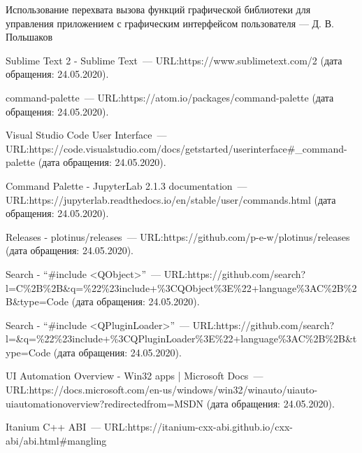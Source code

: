 \renewcommand{\bibname}{Список использованных источников}
\begin{thebibliography}{99}

 Использование перехвата вызова функций графической библиотеки для управления приложением с графическим интерфейсом пользователя --- Д. В. Польшаков

 Sublime Text 2 \-- Sublime Text~---
URL:\@ https://www.sublimetext.com/2
(дата обращения: 24.05.2020).

 command-palette~---
URL:\@ https://atom.io/packages/command-palette
(дата обращения: 24.05.2020).

 Visual Studio Code User Interface~---
URL:\@ https://code.visualstudio.com/docs/getstarted/userinterface\#\_command-palette
(дата обращения: 24.05.2020).

 Command Palette \-- JupyterLab 2.1.3 documentation~---
URL:\@ https://jupyterlab.readthedocs.io/en/stable/user/commands.html
(дата обращения: 24.05.2020).

 Releases \-- plotinus/releases~---
URL:\@  https://github.com/p-e-w/plotinus/releases
(дата обращения: 24.05.2020).

 Search \-- ``\#include <QObject>''~---
URL:\@ https://github.com/search?l=C\%2B\%2B\&q=\%22\%23include+\%3CQObject\%3E\%22+language\%3AC\%2B\%2B\&type=Code
(дата обращения: 24.05.2020).

 Search \-- ``\#include <QPluginLoader>''~---
URL:\@ https://github.com/search?l=\&q=\%22\%23include+\%3CQPluginLoader\%3E\%22+language\%3AC\%2B\%2B\&type=Code
(дата обращения: 24.05.2020).

 UI Automation Overview \-- Win32 apps | Microsoft Docs~---
URL:\@ https://docs.microsoft.com/en-us/windows/win32/winauto/uiauto-uiautomationoverview?redirectedfrom=MSDN
(дата обращения: 24.05.2020).

 Itanium C++ ABI~---
URL:\@ https://itanium-cxx-abi.github.io/cxx-abi/abi.html#mangling

\end{thebibliography}
